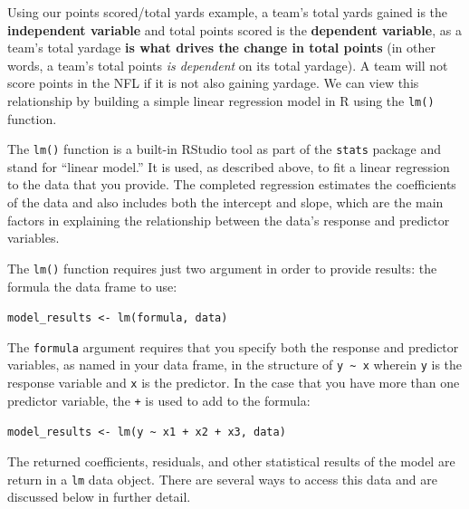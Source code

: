 \documentclass[
  letterpaper,
]{krantz}
\begin{document}
Using our points scored/total yards example, a team's total yards gained
is the \textbf{independent variable} and total points scored is the
\textbf{dependent variable}, as a team's total yardage \textbf{is what
drives the change in total points} (in other words, a team's total
points \emph{is dependent} on its total yardage). A team will not score
points in the NFL if it is not also gaining yardage. We can view this
relationship by building a simple linear regression model in R using the
\texttt{lm()} function.

\begin{tcolorbox}[enhanced jigsaw, left=2mm, toprule=.15mm, opacitybacktitle=0.6, leftrule=.75mm, bottomrule=.15mm, colbacktitle=quarto-callout-note-color!10!white, breakable, colback=white, bottomtitle=1mm, toptitle=1mm, title=\textcolor{quarto-callout-note-color}{\faInfo}\hspace{0.5em}{Note}, coltitle=black, titlerule=0mm, arc=.35mm, opacityback=0, colframe=quarto-callout-note-color-frame, rightrule=.15mm]

The \texttt{lm()} function is a built-in RStudio tool as part of the
\texttt{stats} package and stand for ``linear model.'' It is used, as
described above, to fit a linear regression to the data that you
provide. The completed regression estimates the coefficients of the data
and also includes both the intercept and slope, which are the main
factors in explaining the relationship between the data's response and
predictor variables.

The \texttt{lm()} function requires just two argument in order to
provide results: the formula the data frame to use:

\texttt{model\_results\ \textless{}-\ lm(formula,\ data)}

The \texttt{formula} argument requires that you specify both the
response and predictor variables, as named in your data frame, in the
structure of \texttt{y\ \textasciitilde{}\ x} wherein \texttt{y} is the
response variable and \texttt{x} is the predictor. In the case that you
have more than one predictor variable, the \texttt{+} is used to add to
the formula:

\texttt{model\_results\ \textless{}-\ lm(y\ \textasciitilde{}\ x1\ +\ x2\ +\ x3,\ data)}

The returned coefficients, residuals, and other statistical results of
the model are return in a \texttt{lm} data object. There are several
ways to access this data and are discussed below in further detail.

\end{tcolorbox}
\end{document}

